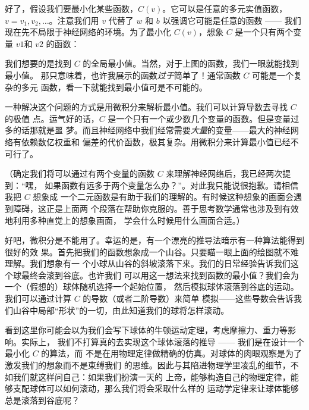 好了，假设我们要最小化某些函数，$C(v)$。它可以是任意的多元实值函数，$v = v_1,
v_2, \ldots$。注意我们用 $v$ 代替了 $w$ 和 $b$ 以强调它可能是任意的函数 —— 我们
现在先不局限于神经网络的环境。为了最小化 $C(v)$，想象 $C$ 是一个只有两个变量
$v1$和 $v2$ 的函数：
\begin{center}
\end{center}

我们想要的是找到 $C$ 的全局最小值。当然，对于上图的函数，我们一眼就能找到最小值。
那只意味着，也许我展示的函数\emph{过于}简单了！通常函数 $C$ 可能是一个复杂的多元
函数，看一下就能找到最小值可是不可能的。

一种解决这个问题的方式是用微积分来解析最小值。我们可以计算导数去寻找 $C$ 的极值
点。运气好的话，$C$ 是一个只有一个或少数几个变量的函数。但是变量过多的话那就是噩
梦。而且神经网络中我们经常需要\emph{大量}的变量——最大的神经网络有依赖数亿权重和
偏差的代价函数，极其复杂。用微积分来计算最小值已经不可行了。

（确定我们将可以通过有两个变量的函数 $C$ 来理解神经网络后，我已经两次提到：``嘿，
  如果函数有远多于两个变量怎么办？''。对此我只能说很抱歉。请相信我把 $C$ 想象成
  一个二元函数是有助于我们的理解的。有时候这种想象的画面会遇到障碍，这正是上面两
  个段落在帮助你克服的。善于思考数学通常也涉及到有效地利用多种直觉上的想象画面，
  学会什么时候用什么画面合适。）

好吧，微积分是不能用了。幸运的是，有一个漂亮的推导法暗示有一种算法能得到很好的效
果。首先把我们的函数想象成一个山谷。只要瞄一眼上面的绘图就不难理解。我们想象有一
个小球从山谷的斜坡滚落下来。我们的日常经验告诉我们这个球最终会滚到谷底。也许我们
可以用这一想法来找到函数的最小值？我们会为一个（假想的）球体随机选择一个起始位置，
然后模拟球体滚落到谷底的运动。我们可以通过计算 $C$ 的导数（或者二阶导数）来简单
模拟——这些导数会告诉我们山谷中局部``形状''的一切，由此知道我们的球将怎样滚动。

看到这里你可能会以为我们会写下球体的牛顿运动定理，考虑摩擦力、重力等影响。实际上，
我们不打算真的去实现这个球体滚落的推导 —— 我们是在设计一个最小化 $C$ 的算法，而
不是在用物理定律做精确的仿真。对球体的肉眼观察是为了激发我们的想象而不是束缚我们
的思维。因此与其陷进物理学里凌乱的细节，不如我们就这样问自己：如果我们扮演一天的
上帝，能够构造自己的物理定律，能够支配球体可以如何滚动，那么我们将会采取什么样的
运动学定律来让球体能够总是滚落到谷底呢？

